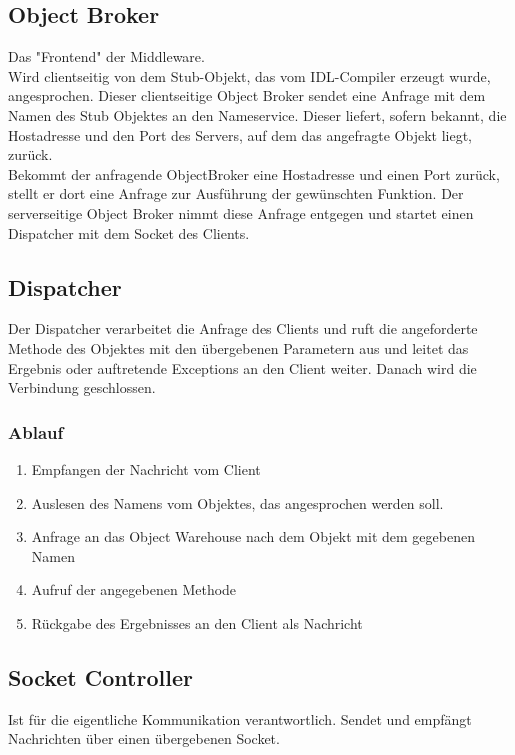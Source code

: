 \subsection{Object Broker}
Das "Frontend"  der Middleware.\\
Wird clientseitig von dem Stub-Objekt, das vom IDL-Compiler erzeugt wurde, angesprochen. Dieser clientseitige Object Broker sendet eine Anfrage mit dem Namen des Stub  Objektes an den Nameservice. Dieser liefert, sofern bekannt, die Hostadresse und den Port des Servers, auf dem das angefragte Objekt liegt, zurück.\\
Bekommt der anfragende ObjectBroker eine Hostadresse und einen Port zurück, stellt er dort eine Anfrage zur Ausführung der gewünschten Funktion. Der serverseitige Object Broker nimmt diese Anfrage entgegen und startet einen Dispatcher mit dem Socket des Clients.

\subsection{Dispatcher}
Der Dispatcher verarbeitet die Anfrage des Clients und ruft die angeforderte Methode des Objektes mit den übergebenen Parametern aus und leitet das Ergebnis oder auftretende Exceptions an den Client weiter. Danach wird die Verbindung geschlossen.

\subsubsection{Ablauf}
\begin{enumerate}
\item Empfangen der Nachricht vom Client
\item Auslesen des Namens vom Objektes, das angesprochen werden soll.
\item Anfrage an das Object Warehouse nach dem Objekt mit dem gegebenen Namen
\item Aufruf der angegebenen Methode
\item Rückgabe des Ergebnisses an den Client als Nachricht
\end{enumerate}

\subsection{Socket Controller}
Ist für die eigentliche Kommunikation verantwortlich. Sendet und empfängt Nachrichten über einen übergebenen Socket.

